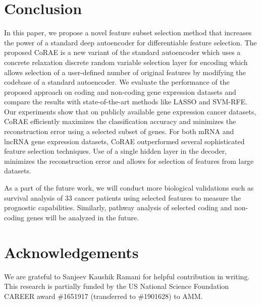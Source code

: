 \documentclass{bioinfo}
\begin{document}
\section{Conclusion}
In this paper, we propose a novel feature subset selection method that increases the power of a standard deep autoencoder for differentiable feature selection. 
The proposed CoRAE is a new variant of the standard autoencoder which uses a concrete relaxation discrete random variable selection layer for encoding which allows selection of a user-defined number of original features
by modifying the codebase of a standard autoencoder. We evaluate the performance of the proposed approach on coding and non-coding gene expression datasets and compare the results with state-of-the-art methods like LASSO and SVM-RFE.
Our experiments show that on publicly available gene expression cancer datasets, CoRAE efficiently maximizes the classification accuracy and minimizes the reconstruction error using a selected subset of genes.
For both mRNA and lncRNA gene expression datasets, CoRAE outperformed several sophisticated feature selection techniques.
Use of a single hidden layer in the decoder, minimizes the reconstruction error and allows for selection of features from large datasets.

As a part of the future work, we will conduct more biological validations such as survival analysis of 33 cancer patients using selected features to measure the prognostic capabilities.
Similarly, pathway analysis of selected coding and non-coding genes will be analyzed in the future.
\section*{Acknowledgements}
We are grateful to Sanjeev Kaushik Ramani for helpful contribution in writing.
This research is partially funded by the US National Science Foundation CAREER award \#1651917 (transferred to \#1901628) to AMM.


%
%
%
%

\end{document}
